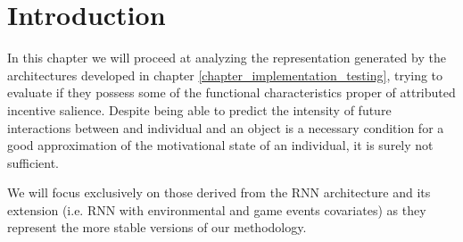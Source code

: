 \section{Introduction}
\label{representation_analysis_introduction}
In this chapter we will proceed at analyzing the representation generated by the architectures developed in chapter \ref{chapter_implementation_testing}, trying to evaluate if they possess some of the functional characteristics proper of attributed incentive salience. Despite being able to predict the intensity of future interactions between and individual and an object is a necessary condition for a good approximation of the motivational state  of an individual, it is surely not sufficient.

We will focus exclusively on those derived from the RNN architecture and its extension (i.e. RNN with environmental and game events covariates) as they represent the more stable versions of our methodology.   






